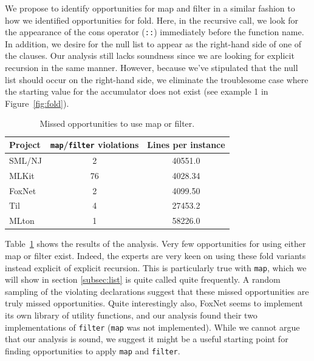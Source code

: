 \documentclass[12pt,abstracton]{scrartcl}
\begin{document}
We propose to identify opportunities for map and filter
in a similar fashion to how we identified opportunities for fold.
Here, in the recursive call, we look for the appearance of the cons operator (\texttt{::})
immediately before the function name. In addition, we desire for the
null list to appear as the right-hand side of one of the clauses.
Our analysis still lacks soundness since we are looking for
explicit recursion in the same manner. However, because we've stipulated
that the null list should occur on the right-hand side, we eliminate
the troublesome case where the starting value for the accumulator does not exist
(see example 1 in Figure~\ref{fig:fold}).

\begin{table}[h!]
\centering
\begin{tabular}{|l||c|c|}\hline
Project & \texttt{map}/\texttt{filter} violations & Lines per instance \\ \hline\hline
SML/NJ & 2 & 40551.0 \\
MLKit & 76 & 4028.34 \\
FoxNet & 2 & 4099.50 \\
Til & 4 & 27453.2 \\
MLton & 1 & 58226.0 \\ \hline
\end{tabular}
\caption{Missed opportunities to use map or filter.}
\label{table:mapfilter}
\end{table}

Table~\ref{table:mapfilter} shows the results of the analysis.
Very few opportunities for using either map or filter exist.
Indeed, the experts are very keen on using these fold variants
instead explicit of explicit recursion.
This is particularly true with \texttt{map}, which we will show in section \ref{subsec:list}
is quite called quite frequently.
A random sampling of the violating declarations suggest that
these missed opportunities are truly missed opportunities.
Quite interestingly also, FoxNet seems to implement its own library
of utility functions, and our analysis found their two
implementations of \texttt{filter} (\texttt{map} was not implemented).
While we cannot argue that our analysis is sound, we suggest it might
be a useful starting point for finding opportunities to apply
\texttt{map} and \texttt{filter}.
\end{document}
